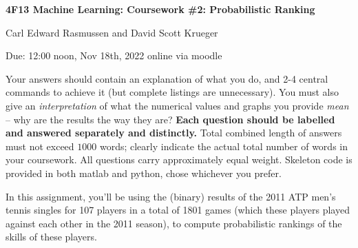 \documentclass[11pt]{article}
\begin{document}
\centerline{\large\bf 4F13 Machine Learning: Coursework \#2:
  Probabilistic Ranking}

\vspace{0.3cm}

\centerline{Carl Edward Rasmussen and David Scott Krueger} 

\vspace{0.2cm}

\centerline{Due: 12:00 noon, Nov 18th, 2022 online via moodle}

\vspace{2mm}

Your answers should contain an explanation of what you do, and 2-4
central commands to achieve it (but complete listings are
unnecessary). You must also give an \emph{interpretation} of what the
numerical values and graphs you provide \emph{mean} -- why are the
results the way they are? {\bf Each question should be labelled and
  answered separately and distinctly.} Total combined length of
answers must not exceed $1000$ words; clearly indicate the actual total
number of words in your coursework. All questions carry approximately
equal weight. Skeleton code is provided in both matlab and python,
chose whichever you prefer.

In this assignment, you'll be using the (binary) results of the 2011
ATP men's tennis singles for 107 players in a total of 1801 games
(which these players played against each other in the 2011 season), to
compute probabilistic rankings of the skills of these players.
\end{document}
